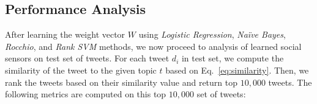

\subsection{Performance Analysis}

After learning the weight vector $W$ using \textit{Logistic
Regression}, \textit{Na\"{i}ve Bayes}, \textit{Rocchio},
and \textit{Rank SVM} methods, we now proceed to analysis of learned
social sensors on test set of tweets.  For each tweet $d_{i}$ in test
set, we compute the similarity of the tweet to the given topic $t$
based on Eq.~\ref{eq:similarity}. Then, we rank the tweets based on
their similarity value and return top $10,000$ tweets. The following
metrics are computed on this top $10,000$ set of tweets:

